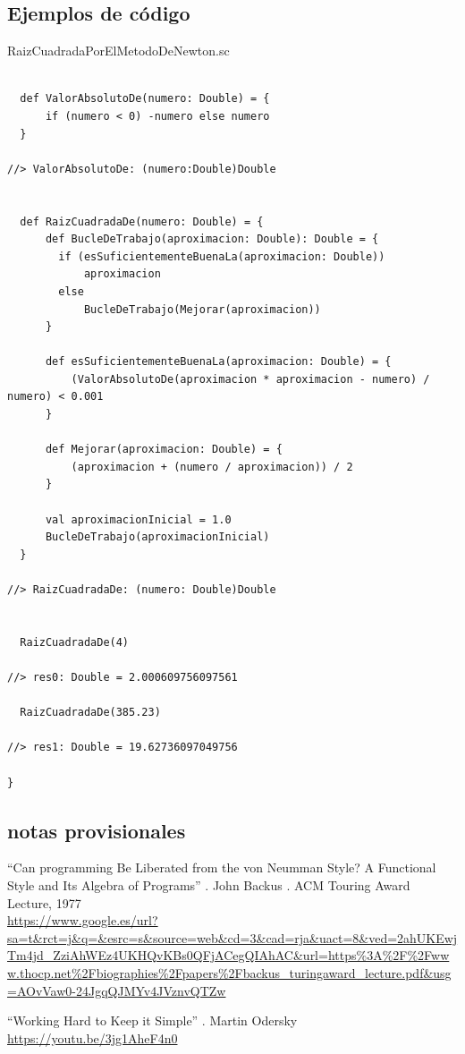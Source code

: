 \documentclass[spanish,12pt,a4paper,final,oneside]{book}
\begin{document}
\subsection*{Ejemplos de código}
RaizCuadradaPorElMetodoDeNewton.sc
\begin{lstlisting}[frame=single]

  def ValorAbsolutoDe(numero: Double) = {
      if (numero < 0) -numero else numero  
  }
  
//> ValorAbsolutoDe: (numero:Double)Double

    
  def RaizCuadradaDe(numero: Double) = {
      def BucleDeTrabajo(aproximacion: Double): Double = {
        if (esSuficientementeBuenaLa(aproximacion: Double)) 
            aproximacion
        else 
            BucleDeTrabajo(Mejorar(aproximacion))
      }
      
      def esSuficientementeBuenaLa(aproximacion: Double) = {
          (ValorAbsolutoDe(aproximacion * aproximacion - numero) / numero) < 0.001
      }
      
      def Mejorar(aproximacion: Double) = {
          (aproximacion + (numero / aproximacion)) / 2
      }
    
      val aproximacionInicial = 1.0
      BucleDeTrabajo(aproximacionInicial)
  }

//> RaizCuadradaDe: (numero: Double)Double

    
  RaizCuadradaDe(4)

//> res0: Double = 2.000609756097561

  RaizCuadradaDe(385.23)

//> res1: Double = 19.62736097049756

}
\end{lstlisting}

\subsection*{notas provisionales}
``Can programming Be Liberated from the von Neumman Style? A Functional Style and Its Algebra of Programs'' . John Backus . ACM Touring Award Lecture, 1977
\\ \url{https://www.google.es/url?sa=t&rct=j&q=&esrc=s&source=web&cd=3&cad=rja&uact=8&ved=2ahUKEwjTm4jd_ZziAhWEz4UKHQvKBs0QFjACegQIAhAC&url=https%3A%2F%2Fwww.thocp.net%2Fbiographies%2Fpapers%2Fbackus_turingaward_lecture.pdf&usg=AOvVaw0-24JgqQJMYv4JVznvQTZw}

``Working Hard to Keep it Simple'' . Martin Odersky
\\ \url{https://youtu.be/3jg1AheF4n0}
\end{document}
